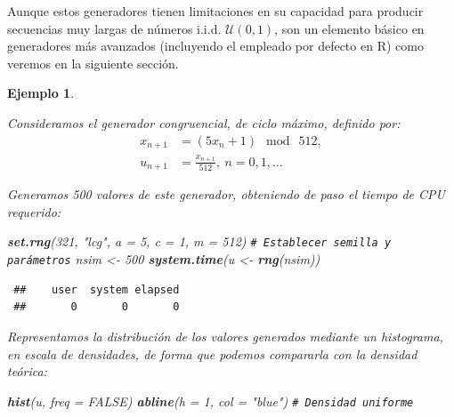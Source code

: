 \documentclass[
  spanish,
  10pt,
]{book}
\newenvironment{Shaded}{\begin{snugshade}}{\end{snugshade}}
\newcommand{\AttributeTok}[1]{\textcolor[rgb]{0.13,0.29,0.53}{#1}}
\newcommand{\CommentTok}[1]{\textcolor[rgb]{0.56,0.35,0.01}{\textit{#1}}}
\newcommand{\ConstantTok}[1]{\textcolor[rgb]{0.56,0.35,0.01}{#1}}
\newcommand{\DecValTok}[1]{\textcolor[rgb]{0.00,0.00,0.81}{#1}}
\newcommand{\FunctionTok}[1]{\textcolor[rgb]{0.13,0.29,0.53}{\textbf{#1}}}
\newcommand{\NormalTok}[1]{#1}
\newcommand{\OtherTok}[1]{\textcolor[rgb]{0.56,0.35,0.01}{#1}}
\newcommand{\StringTok}[1]{\textcolor[rgb]{0.31,0.60,0.02}{#1}}
\theoremstyle{break}
\newtheorem{example}{Ejemplo}[chapter]
\theoremstyle{nonumberplain}
\renewcommand{\CommentTok}[1]{\textcolor[rgb]{0.41,0.41,0.41}{\texttt{#1}}}
\begin{document}
Aunque estos generadores tienen limitaciones en su capacidad para producir secuencias muy largas de números i.i.d. \(\mathcal{U}(0,1)\), son un elemento básico en generadores más avanzados (incluyendo el empleado por defecto en R) como veremos en la siguiente sección.

\begin{example}
\protect\hypertarget{exm:congru512}{}\label{exm:congru512}

Consideramos el generador congruencial, de ciclo máximo, definido por:
\[\begin{aligned}
x_{n+1}  & =(5x_{n}+1)\ \bmod\ 512,\nonumber\\
u_{n+1}  & =\frac{x_{n+1}}{512},\ n=0,1,\dots\nonumber
\end{aligned}\]

Generamos 500 valores de este generador, obteniendo de paso el tiempo de CPU requerido:

\begin{Shaded}
\begin{Highlighting}[]
\FunctionTok{set.rng}\NormalTok{(}\DecValTok{321}\NormalTok{, }\StringTok{"lcg"}\NormalTok{, }\AttributeTok{a =} \DecValTok{5}\NormalTok{, }\AttributeTok{c =} \DecValTok{1}\NormalTok{, }\AttributeTok{m =} \DecValTok{512}\NormalTok{)  }\CommentTok{\# Establecer semilla y parámetros}
\NormalTok{nsim }\OtherTok{\textless{}{-}} \DecValTok{500}
\FunctionTok{system.time}\NormalTok{(u }\OtherTok{\textless{}{-}} \FunctionTok{rng}\NormalTok{(nsim))}
\end{Highlighting}
\end{Shaded}

\begin{verbatim}
 ##    user  system elapsed 
 ##       0       0       0
\end{verbatim}

Representamos la distribución de los valores generados mediante un histograma, en escala de densidades, de forma que podemos compararla con la densidad teórica:

\begin{Shaded}
\begin{Highlighting}[]
\FunctionTok{hist}\NormalTok{(u, }\AttributeTok{freq =} \ConstantTok{FALSE}\NormalTok{)}
\FunctionTok{abline}\NormalTok{(}\AttributeTok{h =} \DecValTok{1}\NormalTok{, }\AttributeTok{col =} \StringTok{"blue"}\NormalTok{) }\CommentTok{\# Densidad uniforme}
\end{Highlighting}
\end{Shaded}


\end{example}
\end{document}
